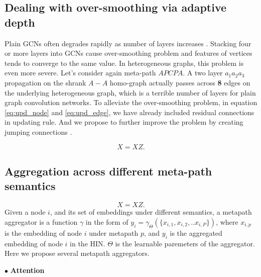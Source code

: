 \subsection{Dealing with over-smoothing via adaptive depth}
Plain GCNs often degrades rapidly as number of layers increases \cite{LiHW18,abs-1904-03751}. Stacking four or more layers into GCNs cause over-smoothing problem and features of vertices tends to converge to the same value. In heterogeneous graphs, this problem is even more severe. Let's consider again meta-path $APCPA$. A two layer $a_1 a_2 a_3$ propagation on the shrank $A-A$ homo-graph actually passes across \textbf{8} edges on the underlying heterogeneous graph, which is a terrible number of layers for plain graph convolution networks.
To alleviate the over-smoothing problem, in equation \ref{eq:upd_node} and \ref{eq:upd_edge}, we have already included residual connections \cite{HeZRS16} in updating rule. And we propose to further improve the problem by creating jumping connections \cite{XuLTSKJ18}.

\begin{equation}
\label{eq:jump}
X = XZ.
\end{equation} 

\subsection{Aggregation across different meta-path semantics}
\begin{equation}
\label{eq:mp}
X = XZ.
\end{equation}
Given a node $i$, and its set of embeddings under different semantics, a metapath aggregator is a function $\gamma$ in the form of $y_i = \gamma_\Theta(\{x_{i,1},x_{i,2},..x_{i,P}\})$, where $x_{i,p}$ is the embedding of node $i$ under metapath $p$, and $y_i$ is the aggregated embedding of node $i$ in the HIN. $\Theta$ is the learnable paremeters of the aggregator.
Here we propose several metapath aggregators. 

$\bullet$ \textbf{Attention}

